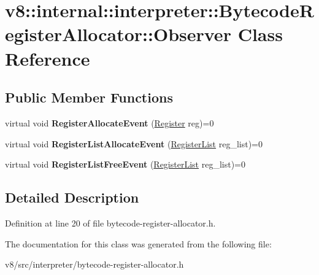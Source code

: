 \hypertarget{classv8_1_1internal_1_1interpreter_1_1BytecodeRegisterAllocator_1_1Observer}{}\section{v8\+:\+:internal\+:\+:interpreter\+:\+:Bytecode\+Register\+Allocator\+:\+:Observer Class Reference}
\label{classv8_1_1internal_1_1interpreter_1_1BytecodeRegisterAllocator_1_1Observer}
\subsection*{Public Member Functions}
\begin{DoxyCompactItemize}
\item 
\mbox{\label{classv8_1_1internal_1_1interpreter_1_1BytecodeRegisterAllocator_1_1Observer_ad92e3b0aed43fec344454850151c25ce}} 
virtual void {\bfseries Register\+Allocate\+Event} (\mbox{\hyperlink{classv8_1_1internal_1_1interpreter_1_1Register}{Register}} reg)=0
\item 
\mbox{\label{classv8_1_1internal_1_1interpreter_1_1BytecodeRegisterAllocator_1_1Observer_a7b3f0a2e68462c744e5f4e810bd2d49f}} 
virtual void {\bfseries Register\+List\+Allocate\+Event} (\mbox{\hyperlink{classv8_1_1internal_1_1interpreter_1_1RegisterList}{Register\+List}} reg\+\_\+list)=0
\item 
\mbox{\label{classv8_1_1internal_1_1interpreter_1_1BytecodeRegisterAllocator_1_1Observer_a3f93cc352552b8cfb3e1c93c7be1cdcd}} 
virtual void {\bfseries Register\+List\+Free\+Event} (\mbox{\hyperlink{classv8_1_1internal_1_1interpreter_1_1RegisterList}{Register\+List}} reg\+\_\+list)=0
\end{DoxyCompactItemize}


\subsection{Detailed Description}


Definition at line 20 of file bytecode-\/register-\/allocator.\+h.



The documentation for this class was generated from the following file\+:\begin{DoxyCompactItemize}
\item 
v8/src/interpreter/bytecode-\/register-\/allocator.\+h\end{DoxyCompactItemize}
